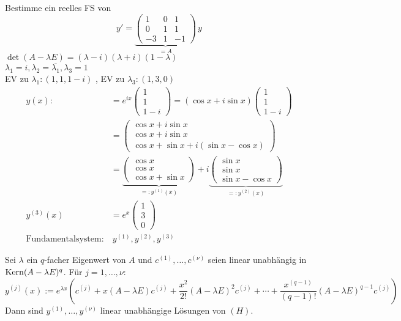 \documentclass[a4paper,twoside,DIV15,BCOR12mm]{scrbook}
\begin{document}
\begin{beispiele}
\item Bestimme ein reelles FS von
$$y' = \underbrace{\begin{pmatrix}1 & 0 & 1 \\ 0 & 1 & 1 \\ -3 & 1 & -1\end{pmatrix}}_{=A} \, y$$
$\det(A - \lambda E) = (\lambda - i)(\lambda + i)(1 - \lambda)$ \\
$\lambda_1 = i, \lambda_2 = \overline{\lambda_1}, \lambda_3 = 1$ \\
EV zu $\lambda_1: (1, 1, 1-i)$ , EV zu $\lambda_3: (1, 3, 0)$ \\
\begin{align*}
y(x) :&= e^{ix}\begin{pmatrix} 1\\1\\1-i \end{pmatrix} = (\cos x + i\sin x)\begin{pmatrix} 1\\1\\1-i \end{pmatrix} \\
     &= \begin{pmatrix} \cos x + i\sin x \\ \cos x + i\sin x \\ \cos x + \sin x + i(\sin x - \cos x) \end{pmatrix} \\
     &=\underbrace{\begin{pmatrix} \cos x \\ \cos x \\ \cos x + \sin x\end{pmatrix}}_{=:y^{(1)}(x)} + i\underbrace{\begin{pmatrix} \sin x \\ \sin x \\ \sin x - \cos x \end{pmatrix}}_{=:y^{(2)}(x)} \\
y^{(3)}(x) &= e^x\begin{pmatrix}1\\3\\0\end{pmatrix} \\
\text{Fundamentalsystem:}&\ y^{(1)}, y^{(2)}, y^{(3)}
\end{align*}
\end{beispiele}

\begin{hilfssatz}[1]
Sei $\lambda$ ein $q$-facher Eigenwert von $A$ und $c^{(1)},\ldots,c^{(\nu)}$ seien linear unabhängig in $\mathop{\mathrm{Kern}}\nolimits (A-\lambda E)^q$. Für $j=1,\ldots,\nu$:
\[ y^{(j)}(x) := e^{\lambda x} \left( c^{(j)} + x(A-\lambda E) c^{(j)} + \frac{x^2}{2!} (A-\lambda E)^2 c^{(j)} + \cdots + \frac{x^{(q-1)}}{(q-1)!} (A-\lambda E)^{q-1}c^{(j)} \right) \]
Dann sind $y^{(1)},\ldots, y^{(\nu)}$ linear unabhängige Lösungen von $(H)$.
\end{hilfssatz}
\end{document}
